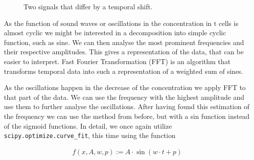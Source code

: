 \begin{figure}[h]
	\centering
	
	\begin{subfigure}[b]{\textwidth}
	\end{subfigure}
	
	\caption{Two signals that differ by a temporal shift.}
	\label{fig:tempoal_shift}
\end{figure}

As the function of sound waves or oscillations in the \Calcium concentration in t cells is almost cyclic we might be interested in a decomposition into simple cyclic function, such as sine. We can then analyse the most prominent frequencies and their respective amplitudes. This gives a representation of the data, that can be easier to interpret. Fast Fourier Transformation (FFT) is an algorithm that transforms temporal data into such a representation of a weighted sum of sines.

As the oscillations happen in the decrease of the \Calcium concentration we apply FFT to that part of the data. We can use the frequency with the highest amplitude and use them to further analyse the oscillations. After having found this estimation of the frequency we can use the method from before, but with a sin function instead of the sigmoid functions. In detail, we once again utilize \texttt{scipy.optimize.curve\_fit}, this time using the function

\begin{align*}
	f(x, A, w, p) := A \cdot \sin(w \cdot t + p)
\end{align*}

